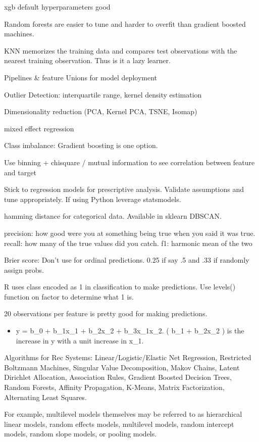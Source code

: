 \documentclass[]{book}
\providecommand{\tightlist}{%
  \setlength{\itemsep}{0pt}\setlength{\parskip}{0pt}}
\begin{document}
xgb default hyperparameters good

Random forests are easier to tune and harder to overfit than gradient boosted machines.

KNN memorizes the training data and compares test observations with the nearest training observation. Thus is it a lazy learner.

Pipelines \& feature Unions for model deployment

Outlier Detection: interquartile range, kernel density estimation

Dimensionality reduction (PCA, Kernel PCA, TSNE, Isomap)

mixed effect regression

Class imbalance: Gradient boosting is one option.

Use binning + chisquare / mutual information to see correlation between feature and target

Stick to regression models for prescriptive analysis. Validate assumptions and tune appropriately. If using Python leverage statsmodels.

hamming distance for categorical data. Available in sklearn DBSCAN.

precision: how good were you at something being true when you said it was true. recall: how many of the true values did you catch. f1: harmonic mean of the two

Brier score: Don't use for ordinal predictions. 0.25 if say .5 and .33 if randomly assign probs.

R uses class encoded as 1 in classification to make predictions. Use levels() function on factor to determine what 1 is.

20 observations per feature is pretty good for making predictions.

\begin{itemize}
\tightlist
\item
  y = b\_0 + b\_1x\_1 + b\_2x\_2 + b\_3x\_1x\_2. ( b\_1 + b\_2x\_2 ) is the increase in y with a unit increase in x\_1.
\end{itemize}

Algorithms for Rec Systems: Linear/Logistic/Elastic Net Regression, Restricted Boltzmann Machines, Singular Value Decomposition, Makov Chains, Latent Dirichlet Allocation, Association Rules, Gradient Boosted Decision Trees, Random Forests, Affinity Propagation, K-Means, Matrix Factorization, Alternating Least Squares.

For example, multilevel models themselves may be referred to as hierarchical linear models, random effects models, multilevel models, random intercept models, random slope models, or pooling models.
\end{document}
